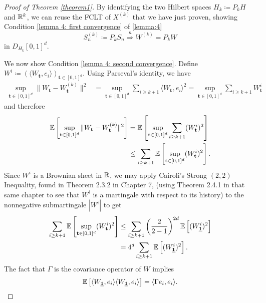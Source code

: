 \begin{proof}[Proof of Theorem \ref{theorem1}]
    By identifying the two Hilbert spaces $H_k \coloneqq P_k H$ and $\mathbb{R}^k$, we can reuse the FCLT of $X^{(k)}$ that we have just proven, showing Condition \eqref{lemma 4: first convergence} of \ref{lemma:4}
    \begin{equation*} %
        S_n^{(k)} \coloneqq P_k S_n \stackrel{n}{\Rightarrow} W^{(k)} = P_k W
    \end{equation*}
    in $D_{H_k}[0,1]^d$. 

    We now show Condition \eqref{lemma 4: second convergence}. Define $W^i \coloneqq (\langle W_\mathbf{t}, e_i \rangle)_{\mathbf{t} \in [0,1]^d}$. Using Parseval's identity, we have
    \begin{align*}
        \sup\limits_{\mathbf{t} \in [0,1]^d} \| W_\mathbf{t}-W^{(k)}_\mathbf{t}\|^2
        & = \sup\limits_{\mathbf{t} \in [0,1]^d} \sum\limits_{i \geq k+1} \langle W_\mathbf{t}, e_i \rangle^2 = \sup\limits_{\mathbf{t} \in [0,1]^d} \sum\limits_{i \geq k+1} W^i_\mathbf{t}
    \end{align*}
    and therefore
    \begin{align*}
        \mathbb{E}\left[\sup\limits_{\mathbf{t} \in [0,1]^d} \| W_\mathbf{t}-W^{(k)}_\mathbf{t}\|^2\right] 
        & = \mathbb{E}\left[\sup\limits_{\mathbf{t} \in [0,1]^d} \sum\limits_{i \geq k+1} (W^i_\mathbf{t})^2\right] \\
        & \leq \sum\limits_{i \geq k+1} \mathbb{E}\left[\sup\limits_{\mathbf{t} \in [0,1]^d} (W^i_\mathbf{t})^2\right].
    \end{align*}
    Since $W^i$ is a Brownian sheet in $\mathbb{R}$, we may apply Cairoli's Strong $(2, 2)$ Inequality, found in \cite{[30]khoshnevisan2002multiparameter} Theorem 2.3.2 in Chapter 7, (using Theorem 2.4.1 in that same chapter to see that $W^i$ is a martingale with respect to its history) to the nonnegative submartingale $|W^i|$ to get
    \begin{align*}
        \sum\limits_{i \geq k+1} \EE{\sup\limits_{\mathbf{t} \in [0,1]^d} (W^i_\mathbf{t})^2}
        & \leq \sum\limits_{i \geq k+1} \left( \frac{2}{2-1} \right)^{2d} \EE{ (W^i_{\usbf[1]})^2} \\
        & = 4^d \sum\limits_{i \geq k+1} \EE{ (W^i_{\usbf[1]})^2}.
    \end{align*}
    The fact that $\Gamma$ is the covariance operator of $W$ implies
    \[ \EE{\langle W_{\usbf[1]}, e_i \rangle \langle W_{\usbf[1]}, e_i \rangle} = \langle \Gamma e_i, e_i \rangle. \]

\end{proof}
